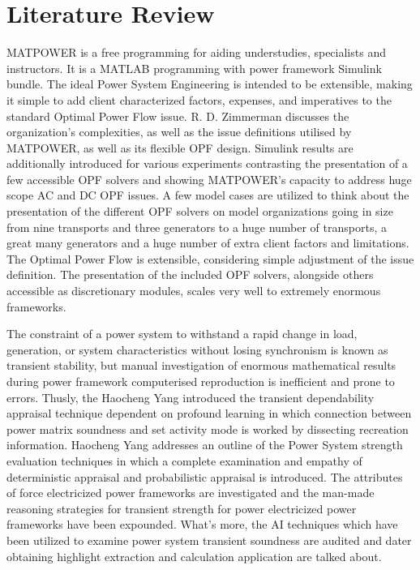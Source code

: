 \section{Literature Review}
MATPOWER is a free programming for aiding understudies, specialists and instructors. It is a MATLAB programming with power framework Simulink bundle. The ideal Power System Engineering is intended to be extensible, making it simple to add client characterized factors, expenses, and imperatives to the standard Optimal Power Flow issue. R. D. Zimmerman \cite{L1} discusses the organization's complexities, as well as the issue definitions utilised by MATPOWER, as well as its flexible OPF design. Simulink results are additionally introduced for various experiments contrasting the presentation of a few accessible OPF solvers and showing MATPOWER's capacity to address huge scope AC and DC OPF issues. A few model cases are utilized to think about the presentation of the different OPF solvers on model organizations going in size from nine transports and three generators to a huge number of transports, a great many generators and a huge number of extra client factors and limitations. The Optimal Power Flow is extensible, considering simple adjustment of the issue definition. The presentation of the included OPF solvers, alongside others accessible as discretionary modules, scales very well to extremely enormous frameworks.

The constraint of a power system to withstand a rapid change in load, generation, or system characteristics without losing synchronism is known as transient stability, but manual investigation of enormous mathematical results during power framework computerised reproduction is inefficient and prone to errors. Thusly, the Haocheng Yang introduced the transient dependability appraisal technique dependent on profound learning in which connection between power matrix soundness and set activity mode is worked by dissecting recreation information. Haocheng Yang \cite{L2} addresses an outline of the Power System strength evaluation techniques in which a complete examination and empathy of deterministic appraisal and probabilistic appraisal is introduced. The attributes of force electricized power frameworks are investigated and the man-made reasoning strategies for transient strength for power electricized power frameworks have been expounded. What's more, the AI techniques which have been utilized to examine power system transient soundness are audited and dater obtaining highlight extraction and calculation application are talked about. 

